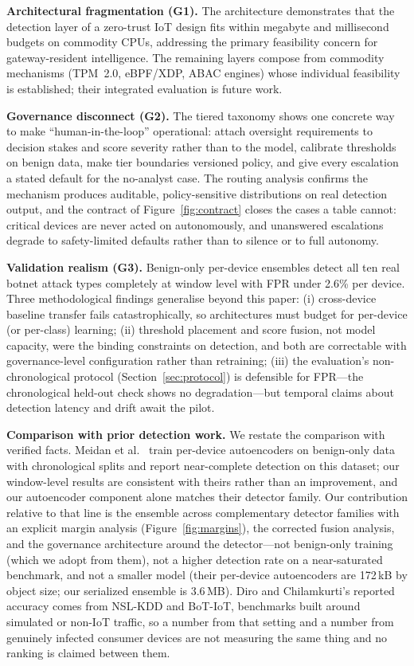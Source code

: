 \documentclass[sigconf,review,anonymous]{acmart}
\begin{document}
\textbf{Architectural fragmentation (G1).} The architecture demonstrates that the detection layer of a zero-trust IoT design fits within megabyte and millisecond budgets on commodity CPUs, addressing the primary feasibility concern for gateway-resident intelligence. The remaining layers compose from commodity mechanisms (TPM~2.0, eBPF/XDP, ABAC engines) whose individual feasibility is established; their integrated evaluation is future work.

\textbf{Governance disconnect (G2).} The tiered taxonomy shows one concrete way to make ``human-in-the-loop'' operational: attach oversight requirements to decision stakes and score severity rather than to the model, calibrate thresholds on benign data, make tier boundaries versioned policy, and give every escalation a stated default for the no-analyst case. The routing analysis confirms the mechanism produces auditable, policy-sensitive distributions on real detection output, and the contract of Figure~\ref{fig:contract} closes the cases a table cannot: critical devices are never acted on autonomously, and unanswered escalations degrade to safety-limited defaults rather than to silence or to full autonomy.

\textbf{Validation realism (G3).} Benign-only per-device ensembles detect all ten real botnet attack types completely at window level with FPR under 2.6\% per device. Three methodological findings generalise beyond this paper: (i) cross-device baseline transfer fails catastrophically, so architectures must budget for per-device (or per-class) learning; (ii) threshold placement and score fusion, not model capacity, were the binding constraints on detection, and both are correctable with governance-level configuration rather than retraining; (iii) the evaluation's non-chronological protocol (Section~\ref{sec:protocol}) is defensible for FPR---the chronological held-out check shows no degradation---but temporal claims about detection latency and drift await the pilot.

\textbf{Comparison with prior detection work.} We restate the comparison with verified facts. Meidan et al.~\cite{meidan2018nbaiot} train per-device autoencoders on benign-only data with chronological splits and report near-complete detection on this dataset; our window-level results are consistent with theirs rather than an improvement, and our autoencoder component alone matches their detector family. Our contribution relative to that line is the ensemble across complementary detector families with an explicit margin analysis (Figure~\ref{fig:margins}), the corrected fusion analysis, and the governance architecture around the detector---not benign-only training (which we adopt from them), not a higher detection rate on a near-saturated benchmark, and not a smaller model (their per-device autoencoders are 172\,kB by object size; our serialized ensemble is 3.6\,MB). Diro and Chilamkurti's reported accuracy comes from NSL-KDD and BoT-IoT, benchmarks built around simulated or non-IoT traffic, so a number from that setting and a number from genuinely infected consumer devices are not measuring the same thing and no ranking is claimed between them.
\end{document}
